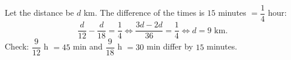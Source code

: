 Let the distance be $d$ km. The difference of the times is $15$ minutes $=\dfrac{1}{4}$ hour:
\[
\dfrac{d}{12}-\dfrac{d}{18}=\dfrac{1}{4}\iff\dfrac{3d-2d}{36}=\dfrac{1}{4}\iff d=\boxed{9\text{ km}}.
\]
Check: $\dfrac{9}{12}$ h $=45$ min and $\dfrac{9}{18}$ h $=30$ min differ by $15$ minutes.
